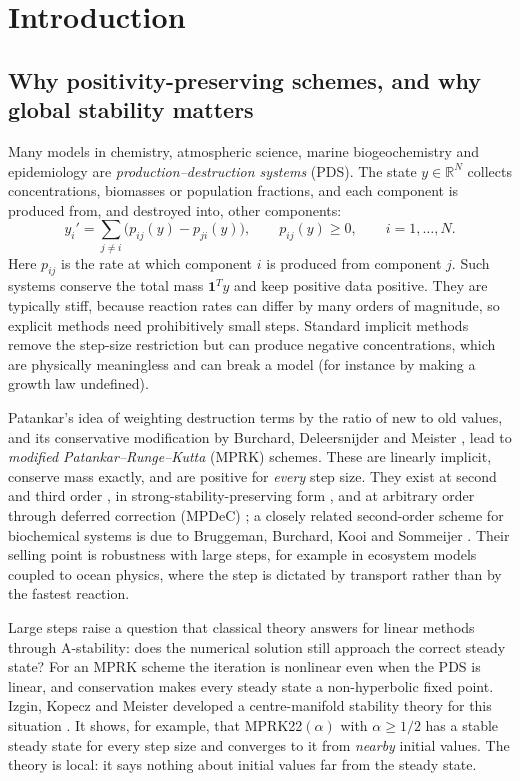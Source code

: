\documentclass[11pt,a4paper]{article}
\theoremstyle{plain}
\theoremstyle{definition}
\newcommand{\R}{\mathbb R}
\begin{document}
\tableofcontents

\section{Introduction}\label{sec:intro}

\subsection{Why positivity-preserving schemes, and why global stability matters}

Many models in chemistry, atmospheric science, marine biogeochemistry and epidemiology are \emph{production--destruction systems} (PDS). The state $y\in\R^N$ collects concentrations, biomasses or population fractions, and each component is produced from, and destroyed into, other components:
\begin{equation}\label{eq:pds}
 y_i'=\sum_{j\ne i}\bigl(p_{ij}(y)-p_{ji}(y)\bigr),\qquad p_{ij}(y)\ge0,\qquad i=1,\dots,N .
\end{equation}
Here $p_{ij}$ is the rate at which component $i$ is produced from component $j$. Such systems conserve the total mass $\mathbf 1^Ty$ and keep positive data positive. They are typically stiff, because reaction rates can differ by many orders of magnitude, so explicit methods need prohibitively small steps. Standard implicit methods remove the step-size restriction but can produce negative concentrations, which are physically meaningless and can break a model (for instance by making a growth law undefined).

Patankar's idea \cite{Patankar1980} of weighting destruction terms by the ratio of new to old values, and its conservative modification by Burchard, Deleersnijder and Meister \cite{BDM2003}, lead to \emph{modified Patankar--Runge--Kutta} (MPRK) schemes. These are linearly implicit, conserve mass exactly, and are positive for \emph{every} step size. They exist at second and third order \cite{KM2018a,KM2018b}, in strong-stability-preserving form \cite{HS2019}, and at arbitrary order through deferred correction (MPDeC) \cite{OT2020}; a closely related second-order scheme for biochemical systems is due to Bruggeman, Burchard, Kooi and Sommeijer \cite{BBKS2007}. Their selling point is robustness with large steps, for example in ecosystem models coupled to ocean physics, where the step is dictated by transport rather than by the fastest reaction.

Large steps raise a question that classical theory answers for linear methods through A-stability: does the numerical solution still approach the correct steady state? For an MPRK scheme the iteration is nonlinear even when the PDS is linear, and conservation makes every steady state a non-hyperbolic fixed point. Izgin, Kopecz and Meister developed a centre-manifold stability theory for this situation \cite{IKM2022a,IKM2022b}. It shows, for example, that MPRK22$(\alpha)$ with $\alpha\ge1/2$ has a stable steady state for every step size and converges to it from \emph{nearby} initial values. The theory is local: it says nothing about initial values far from the steady state.
\end{document}
